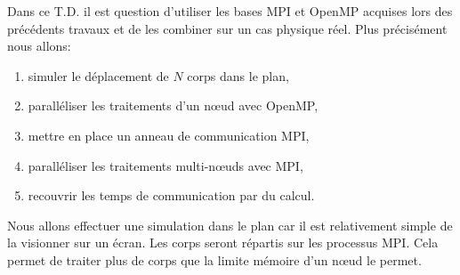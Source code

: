 Dans ce T.D. il est question d'utiliser les bases MPI et OpenMP acquises lors des précédents travaux et de les combiner sur un cas physique réel.
Plus précisément nous allons:
\begin{enumerate}
	\item simuler le déplacement de $N$ corps dans le plan,
	\item paralléliser les traitements d'un n\oe ud avec OpenMP,
	\item mettre en place un anneau de communication MPI,
	\item paralléliser les traitements multi-n\oe uds avec MPI,
	\item recouvrir les temps de communication par du calcul.
\end{enumerate}

Nous allons effectuer une simulation dans le plan car il est relativement simple de la visionner sur un écran.
Les corps seront répartis sur les processus MPI. Cela permet de traiter plus de corps que la limite mémoire d'un n\oe ud le permet.
